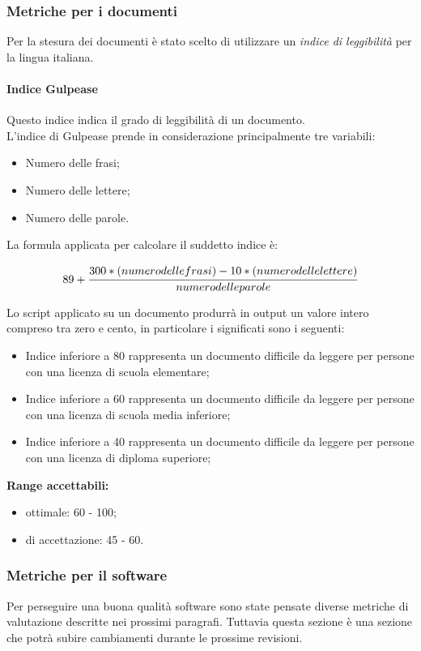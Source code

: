 \documentclass{scalatekids-article}
\begin{document}
\subsubsection{Metriche per i documenti}
\label{sec:metricheDocumenti}
Per la stesura dei documenti è stato scelto di utilizzare un \textit{indice di leggibilità} per la lingua italiana.
\paragraph{Indice Gulpease}
\label{par:metricheGulpease}
Questo indice indica il grado di leggibilità di un documento.\\L'indice di Gulpease prende in considerazione principalmente tre variabili:
\begin{itemize}
\item Numero delle frasi;
\item Numero delle lettere;
\item Numero delle parole.
\end{itemize}
La formula applicata per calcolare il suddetto indice è:
\begin{center}
\begin{equation}
  89 + \cfrac{300 * (numero delle frasi) - 10 * (numero delle lettere)}{numero delle parole}
\end{equation}
\end{center}
Lo script applicato su un documento produrrà in output un valore intero compreso tra zero e cento, in particolare i significati sono i seguenti:
\begin{itemize}
  \item Indice inferiore a 80 rappresenta un documento difficile da leggere per persone con una licenza di scuola elementare;
  \item Indice inferiore a 60 rappresenta un documento difficile da leggere per persone con una licenza di scuola media inferiore;
  \item Indice inferiore a 40 rappresenta un documento difficile da leggere per persone con una licenza di diploma superiore;
\end{itemize}
\textbf{Range accettabili:}
\begin{itemize}
  \item {} ottimale: 60 - 100;
  \item {} di accettazione: 45 - 60.
\end{itemize}
\subsubsection{Metriche per il software}
\label{sec:metricheSW}
Per perseguire una buona qualità software sono state pensate diverse metriche di valutazione descritte nei prossimi paragrafi. Tuttavia questa sezione è una sezione che potrà subire cambiamenti durante le prossime revisioni.
\end{document}
